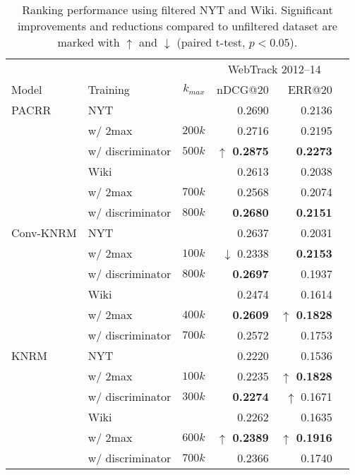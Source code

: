 \begin{table}
\centering
\scriptsize
\caption{Ranking performance using filtered NYT and Wiki. Significant improvements and reductions compared to unfiltered dataset are marked with $\uparrow$ and $\downarrow$ (paired t-test, $p<0.05$).}
\vspace{-1em}
\label{tab:filter_results}
\begin{tabular}{llrrrr}
\toprule
&&&\multicolumn{2}{c}{WebTrack 2012--14} \\\cmidrule(lr){4-5}
Model & Training & $k_{max}$ & nDCG@20 & ERR@20 \\
\midrule

PACRR &  NYT &  & 0.2690  & 0.2136 \\
 & w/ 2max & $200k$ & 0.2716  & 0.2195 \\
 & w/ discriminator & $500k$ & \bf $\uparrow$ 0.2875  & \bf 0.2273 \\
\midrule
 & Wiki &  & 0.2613  & 0.2038 \\
 & w/ 2max & $700k$ & 0.2568  & 0.2074 \\
 & w/ discriminator & $800k$ & \bf 0.2680  & \bf 0.2151 \\
\midrule
Conv-KNRM &  NYT &  & 0.2637  & 0.2031 \\
 & w/ 2max & $100k$ & $\downarrow$ 0.2338  & \bf 0.2153 \\
 & w/ discriminator & $800k$ & \bf 0.2697  & 0.1937 \\
\midrule
 & Wiki &  & 0.2474  & 0.1614 \\
 & w/ 2max & $400k$ & \bf 0.2609  & \bf $\uparrow$ 0.1828 \\
 & w/ discriminator & $700k$ & 0.2572  & 0.1753 \\
\midrule
KNRM &  NYT &  & 0.2220  & 0.1536 \\
 & w/ 2max & $100k$ & 0.2235  & \bf $\uparrow$ 0.1828 \\
 & w/ discriminator & $300k$ & \bf 0.2274  & $\uparrow$ 0.1671 \\
\midrule
 & Wiki &  & 0.2262  & 0.1635 \\
 & w/ 2max & $600k$ & \bf $\uparrow$ 0.2389  & \bf $\uparrow$ 0.1916 \\
 & w/ discriminator & $700k$ & 0.2366  & 0.1740 \\


\bottomrule
\end{tabular}
\vspace{-2em}
\end{table}
